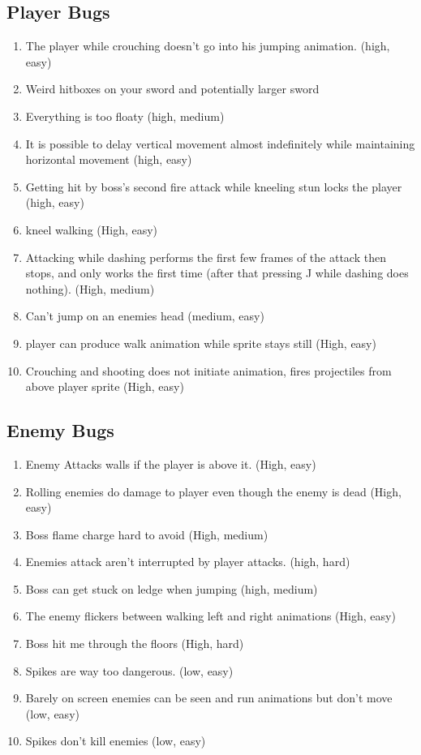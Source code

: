 \documentclass{article}
\begin{document}
\subsection*{Player Bugs}
\begin{enumerate}
	\item The player while crouching doesn't go into his jumping animation. (high, easy)
		\item Weird hitboxes on your sword and potentially larger sword
			\item Everything is too floaty (high, medium)
				\item It is possible to delay vertical movement almost indefinitely while maintaining horizontal movement (high, easy)
					\item Getting hit by boss's second fire attack while kneeling stun locks the player (high, easy)
						\item kneel walking (High, easy)
							\item Attacking while dashing performs the first few frames of the attack then stops, and only works the first time (after that pressing J while dashing does nothing). (High, medium)
								\item Can't jump on an enemies head (medium, easy)
									\item player can produce walk animation while sprite stays still (High, easy)
									\item Crouching and shooting does not initiate animation, fires projectiles from above player sprite (High, easy)
\end{enumerate}
\subsection*{Enemy Bugs}
\begin{enumerate}
	\item Enemy Attacks walls if the player is above it. (High, easy)
		\item Rolling enemies do damage to player even though the enemy is dead (High, easy)
			\item Boss flame charge  hard to avoid (High, medium)
				\item Enemies attack aren't interrupted by player attacks.  (high, hard)
					\item Boss can get stuck on ledge when jumping (high, medium)
						\item The enemy flickers between walking left and right animations  (High, easy)
							\item Boss hit me through the floors  (High, hard)
								\item Spikes are way too dangerous. (low, easy)
									\item Barely on screen enemies can be seen and run animations but don't move (low, easy)
										\item Spikes don't kill enemies (low, easy)
										
\end{enumerate}
\end{document}
